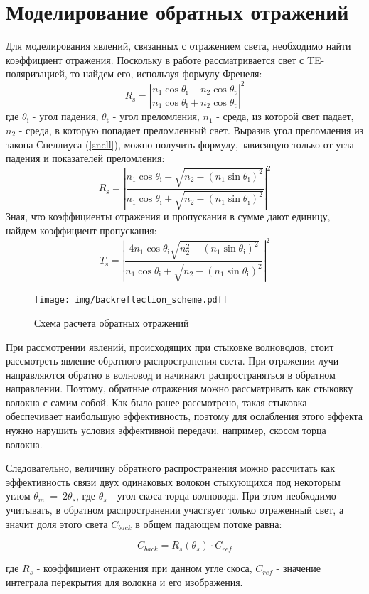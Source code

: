 \section{Моделирование обратных отражений}
\label{backreflection_method}
Для моделирования явлений, связанных с отражением света, необходимо найти коэффициент отражения. Поскольку в работе рассматривается свет с TE-поляризацией, то найдем его, используя формулу Френеля:
\begin{equation}
R_\mathrm{s} = \left|\frac{n_1\cos\theta_{\mathrm{i}}-n_2\cos\theta_{\mathrm{t}}}{n_1\cos\theta_{\mathrm{i}}+n_2\cos\theta_{\mathrm{t}}}\right|^2
\end{equation}
где $\theta_{\mathrm{i}}$ - угол падения, $\theta_{\mathrm{t}}$ - угол преломления, $n_1$ - среда, из которой свет падает, $n_2$ - среда, в которую попадает преломленный свет. Выразив угол преломления из закона Снеллиуса (\ref{snell}), можно получить формулу, зависящую только от угла падения и показателей преломления:
\begin{equation} 
R_\mathrm{s}=\left|\frac{n_1\cos\theta_{\mathrm{i}}-\sqrt{n_2-\left(n_1 \sin\theta_{\mathrm{i}}\right)^2}}{n_1\cos\theta_{\mathrm{i}}+\sqrt{n_2-\left(n_1 \sin\theta_{\mathrm{i}}\right)^2}}\right|^2
\label{frenel_ref}
\end{equation}
Зная, что коэффициенты отражения и пропускания в сумме дают единицу, найдем коэффициент пропускания:
\begin{equation}
T_\mathrm{s}=\left|\frac{4n_1\cos\theta_{\mathrm{i}}\sqrt{n_2^2-\left(n_1\sin\theta_{\mathrm{i}}\right)^2}}{n_1\cos\theta_{\mathrm{i}}+\sqrt{n_2-\left(n_1 \sin\theta_{\mathrm{i}}\right)^2}}\right|^2
\label{frenel_tm}
\end{equation}

\begin{figure}[h!]
	\texttt{[image: img/backreflection\_scheme.pdf]}
	\caption{Схема расчета обратных отражений}
\end{figure}

При рассмотрении явлений, происходящих при стыковке волноводов, стоит рассмотреть явление обратного распространения света. При отражении лучи направляются обратно в волновод и начинают распространяться в обратном направлении. Поэтому, обратные отражения можно рассматривать как стыковку волокна с самим собой. Как было ранее рассмотрено, такая стыковка обеспечивает наибольшую эффективность, поэтому для ослабления этого эффекта нужно нарушить условия эффективной передачи, например, скосом торца волокна.

Следовательно, величину обратного распространения можно рассчитать как эффективность связи двух одинаковых волокон стыкующихся под некоторым углом $\theta_m~=~2\theta_s$, где $\theta_s$ - угол скоса торца волновода. При этом необходимо учитывать, в обратном распространении участвует только отраженный свет, а значит доля этого света $C_{back}$ в общем падающем потоке равна:

\begin{equation}
	C_{back} = R_s(\theta_s) \cdot C_{ref}
\end{equation}

где $R_s$ - коэффициент отражения при данном угле скоса, $C_{ref}$ - значение интеграла перекрытия для волокна и его изображения.
